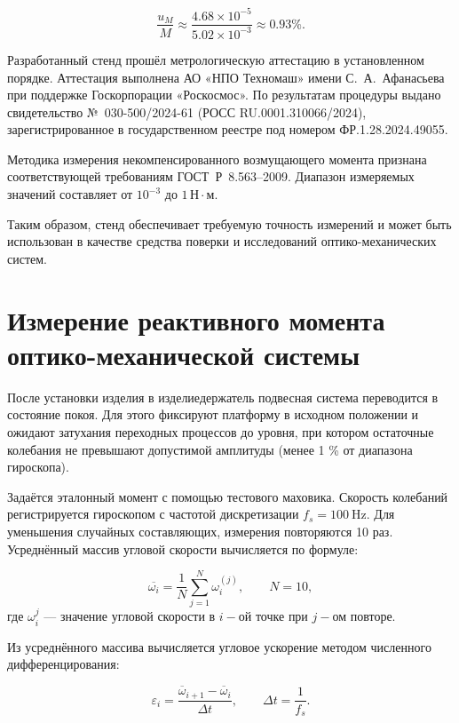 \begin{equation}
	\frac{u_{M}}{M} \approx 
	\frac{4.68 \times 10^{-5}}{5.02 \times 10^{-3}}
	\approx 0.93\% .
\end{equation}

Разработанный стенд прошёл метрологическую аттестацию в установленном порядке. 
Аттестация выполнена АО «НПО Техномаш» имени С.~А.~Афанасьева при поддержке 
Госкорпорации «Роскосмос». По результатам процедуры выдано свидетельство 
№~030-500/2024-61 (РОСС RU.0001.310066/2024), зарегистрированное в государственном 
реестре под номером ФР.1.28.2024.49055.

Методика измерения некомпенсированного возмущающего момента признана 
соответствующей требованиям ГОСТ~Р~8.563--2009. Диапазон измеряемых значений 
составляет от $10^{-3}$ до $1 \,\text{Н}\cdot\text{м}$.  

Таким образом, стенд обеспечивает требуемую точность измерений 
и может быть использован в качестве средства поверки и исследований 
оптико-механических систем. %

	
\section{Измерение реактивного момента оптико-механической системы}

После установки изделия в изделиедержатель подвесная система переводится в состояние покоя. Для этого фиксируют платформу в исходном положении и ожидают затухания переходных процессов до уровня, при котором остаточные колебания не превышают допустимой амплитуды (менее 1 \% от диапазона гироскопа).

Задаётся эталонный момент с помощью тестового маховика. Скорость колебаний регистрируется гироскопом с частотой дискретизации $f_s=\SI{100}{\hertz}$. Для уменьшения случайных составляющих, измерения повторяются 10 раз. Усреднённый массив угловой скорости вычисляется по формуле:

\begin{equation}
	\label{eq:mean_spd}
	\overline{\omega_{i}}=\frac{1}{N}\sum_{j=1}^{N}\omega_{i}^{(j)}, \qquad N = 10,
\end{equation}
где \(\omega_{i}^j\) --- значение угловой скорости в $i-$ой точке при $j-$ом повторе.

Из усреднённого массива вычисляется угловое ускорение методом численного дифференцирования:

\begin{equation}
	\label{eq:mean_acc}
	\varepsilon_{i}
	= \frac{\overline{\omega}_{i+1}-\overline{\omega}_{i}}{\Delta t},
	\qquad
	\Delta t = \frac{1}{f_s}.
\end{equation}

